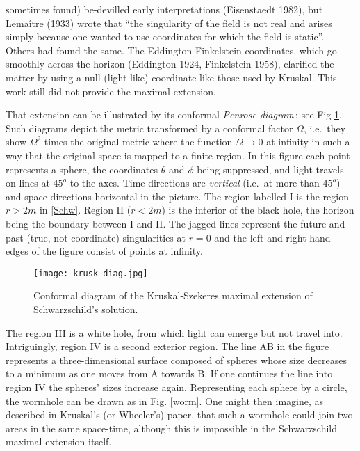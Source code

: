 \documentclass[11pt]{article}
\begin{document}
sometimes found) be-devilled early interpretations (Eisenstaedt 1982), but Lema\^{i}tre (1933) wrote that ``the 
singularity of the field is not real and arises simply because one wanted to use coordinates for which the field 
is static''. Others had found the same. The Eddington-Finkelstein coordinates, which go smoothly across the horizon 
(Eddington 1924, Finkelstein 1958), clarified the matter by using a null (light-like) coordinate like those used by 
Kruskal.  This work still did not provide the maximal extension. 
\par\smallskip%
That extension can be illustrated by its conformal \textit{Penrose diagram}\,; see Fig \ref{Penrose}. Such diagrams 
depict the metric transformed by a conformal factor $\Omega$, i.e.\ they show $\Omega^2$ times the original metric 
where the function $\Omega\rightarrow 0$ at infinity in such a way that the original space is mapped to a finite 
region. In this figure each point represents a sphere,  the coordinates $\theta$ and $\phi$ being suppressed, and 
light travels on lines at $45^o$ to the axes. Time directions are \textit{vertical} (i.e.\ at more than $45^o$) and 
space directions horizontal in the picture. The region labelled I is the region $r>2m$ in \eqref{Schw}. Region II 
($r<2m$) is the interior of the black hole, the horizon being the boundary between I and II. The jagged lines 
represent the future and past (true, not coordinate) singularities at $r=0$ and the left and right hand edges of 
the figure consist of points at infinity.
\begin{figure}[h]
\begin{center}
\texttt{[image: krusk-diag.jpg]}
\end{center}
\caption{\scriptsize Conformal diagram of the Kruskal-Szekeres maximal extension of Schwarzschild's solution. 
}\label{Penrose}
\end{figure}
The region III is a white hole, from which light can emerge but not travel into. Intriguingly, region IV is a second exterior region. The line AB in the figure represents a three-dimensional surface composed of spheres whose size decreases to a minimum as one moves from A towards B. If one continues the line into region IV the spheres' sizes increase again. Representing each sphere by a circle, the wormhole can be drawn as in Fig. \ref{worm}. One might then imagine, as described in Kruskal's (or Wheeler's) paper, that such a wormhole could join two areas in the same space-time, although this is impossible in the Schwarzschild maximal extension itself.
\end{document}

